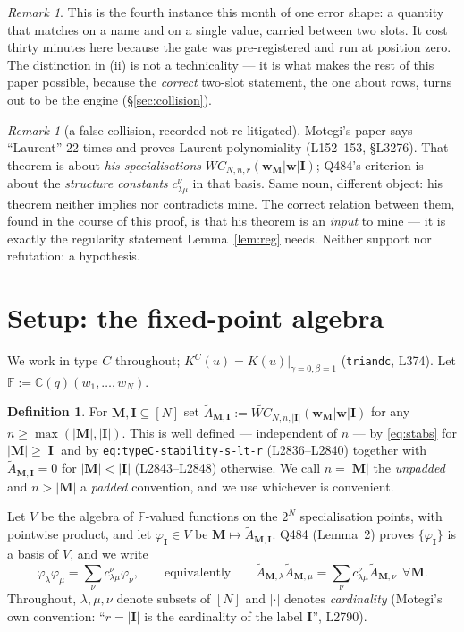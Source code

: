 \documentclass[11pt]{article}
\theoremstyle{plain}
\theoremstyle{definition}
\newtheorem{defn}[thm]{Definition}
\theoremstyle{remark}
\newtheorem{rem}[thm]{Remark}
\theoremstyle{plain}
\newcommand{\bI}{\mathbf{I}}
\newcommand{\bM}{\mathbf{M}}
\newcommand{\bw}{\mathbf{w}}
\newcommand{\WCt}{\widetilde{WC}}
\newcommand{\At}{\widetilde{A}}
\begin{document}
\begin{rem}
This is the fourth instance this month of one error shape: a quantity that
matches on a name and on a single value, carried between two slots.  It cost
thirty minutes here because the gate was pre-registered and run at position
zero.  The distinction in (ii) is not a technicality --- it is what makes the
rest of this paper possible, because the \emph{correct} two-slot statement, the
one about rows, turns out to be the engine (\S\ref{sec:collision}).
\end{rem}

\begin{rem}[a false collision, recorded not re-litigated]
Motegi's paper says ``Laurent'' $22$ times and proves Laurent polynomiality
(L152--153, \S L3276).  That theorem is about \emph{his specialisations}
$\WCt_{N,n,r}(\bw_{\bM}|\bw|\bI)$; Q484's criterion is about the
\emph{structure constants} $c^{\nu}_{\lambda\mu}$ in that basis.  Same noun,
different object: his theorem neither implies nor contradicts mine.  The
correct relation between them, found in the course of this proof, is that his
theorem is an \emph{input} to mine --- it is exactly the regularity statement
Lemma~\ref{lem:reg} needs.  Neither support nor refutation: a hypothesis.
\end{rem}

\section{Setup: the fixed-point algebra}
\label{sec:setup}

We work in type $C$ throughout; $K^C(u)=K(u)|_{\gamma=0,\beta=1}$
(\texttt{triandc}, L374).  Let $\mathbb{F}:=\mathbb{C}(q)(w_1,\dots,w_N)$.

\begin{defn}
For $\bM,\bI\subseteq[N]$ set
$\At_{\bM,\bI}:=\WCt_{N,n,|\bI|}(\bw_{\bM}|\bw|\bI)$ for any
$n\ge\max(|\bM|,|\bI|)$.  This is well defined --- independent of $n$ --- by
\eqref{eq:stabs} for $|\bM|\ge|\bI|$ and by
\texttt{eq:typeC-stability-s-lt-r} (L2836--L2840) together with
$\At_{\bM,\bI}=0$ for $|\bM|<|\bI|$ (L2843--L2848) otherwise.  We call
$n=|\bM|$ the \emph{unpadded} and $n>|\bM|$ a \emph{padded} convention, and we
use whichever is convenient.
\end{defn}

Let $V$ be the algebra of $\mathbb{F}$-valued functions on the $2^N$
specialisation points, with pointwise product, and let
$\varphi_{\bI}\in V$ be $\bM\mapsto\At_{\bM,\bI}$.  Q484 (Lemma~2) proves
$\{\varphi_{\bI}\}$ is a basis of $V$, and we write
\begin{equation}
\varphi_{\lambda}\varphi_{\mu}=\sum_{\nu}c^{\nu}_{\lambda\mu}\varphi_{\nu},
\qquad\text{equivalently}\qquad
\At_{\bM,\lambda}\At_{\bM,\mu}=\sum_{\nu}c^{\nu}_{\lambda\mu}\At_{\bM,\nu}
\ \ \forall\bM.
\label{eq:star}
\end{equation}
Throughout, $\lambda,\mu,\nu$ denote subsets of $[N]$ and $|\cdot|$ denotes
\emph{cardinality} (Motegi's own convention: ``$r=|\bI|$ is the cardinality of
the label $\bI$'', L2790).
\end{document}
